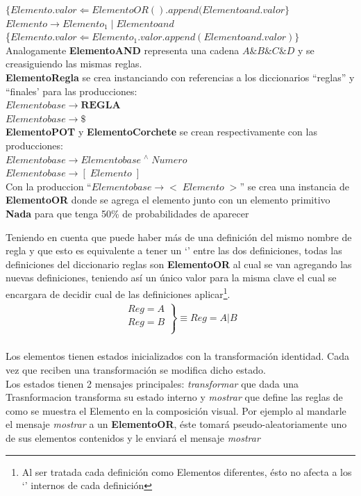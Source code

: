 \documentclass[10pt,a4paper]{article}
\begin{document}
$\{Elemento.valor \Leftarrow{} ElementoOR().append(Elementoand.valor\}$\\
$Elemento\rightarrow{}Elemento_{1}\;|\;Elementoand$\\
\{$Elemento.valor \Leftarrow{}Elemento_{1}.valor.append(Elementoand.valor)\}$\\
Analogamente \textbf{ElementoAND} representa una cadena $A\&B\&C\&D$ y se creasiguiendo las mismas reglas.\\
\textbf{ElementoRegla} se crea instanciando  con referencias a los diccionarios ``reglas'' y ``finales' para las producciones:\\
$Elementobase\rightarrow{}\textbf{REGLA}$\\
$Elementobase\rightarrow{}\$$\\
\textbf{ElementoPOT} y  \textbf{ElementoCorchete} se crean respectivamente con las producciones:\\
$Elementobase\rightarrow{}Elementobase\;{}^\wedge\;Numero$\\
$Elementobase\rightarrow{}[\;Elemento\;]$\\
Con la produccion ``$Elementobase\rightarrow{}<\;Elemento\;>$''
se crea una instancia de \textbf{ElementoOR} donde se agrega el elemento junto con un elemento primitivo \textbf{Nada} para que tenga 50\% de probabilidades de aparecer

Teniendo en cuenta que puede haber más de una definición del mismo nombre de regla y que esto es equivalente a tener un `\textbar' entre las dos definiciones, todas las definiciones del diccionario reglas son \textbf{ElementoOR} al cual se van agregando las nuevas definiciones, teniendo así un único valor para la misma clave el cual se encargara de decidir cual de las definiciones aplicar\footnote{Al ser tratada cada definición como Elementos diferentes, ésto no afecta a los `\textbar' internos de cada definición}.\\
\begin{align}
\left.\begin{matrix}Reg = A\\
Reg = B\\
\end{matrix}\right\} \equiv Reg = A|B
\end{align}
\\
Los elementos tienen estados inicializados con la transformación identidad. Cada vez que reciben una transformación se modifica dicho estado.\\
Los estados tienen 2 mensajes principales: \textit{transformar} que dada una Trasnformacion transforma su estado interno y \textit{mostrar} que define las reglas de como se muestra el Elemento en la composición visual. Por ejemplo al mandarle el mensaje \textit{mostrar} a un \textbf{ElementoOR}, éste tomará pseudo-aleatoriamente uno de sus elementos contenidos y le enviará el mensaje \textit{mostrar}
\end{document}
